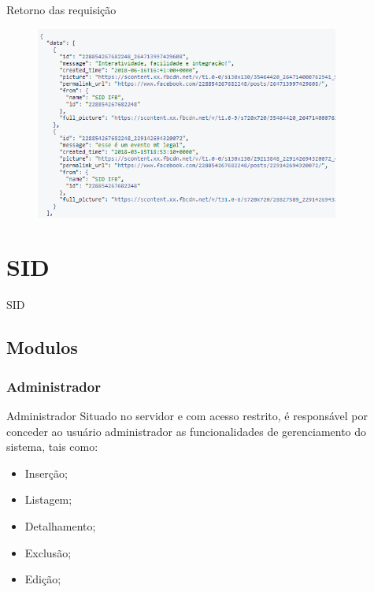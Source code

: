 \documentclass{aula-ifb}
\begin{document}
\begin{frame}{Retorno das requisição}
\begin{figure}[h]
\includegraphics[width=10cm]{figuras/requisicao2.png}
\label{fig:facebookgraph}
\end{figure}
\end{frame}

\section{SID}
\begin{frame}
SID
\end{frame}
\subsection{Modulos}
\subsubsection{Administrador}
\begin{frame}{Administrador}
Situado no servidor e com acesso restrito, é responsável por conceder ao usuário administrador as funcionalidades de gerenciamento do sistema, tais como:
\begin{itemize}
   \item Inserção;
   \item Listagem;
   \item Detalhamento;
   \item Exclusão;
   \item Edição;
\end{itemize}
\end{frame}
\end{document}
